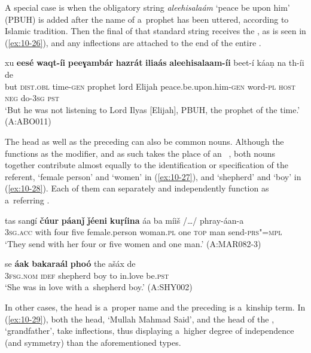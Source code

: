A special case is when the obligatory string \textit{aleehisalaám} `peace be upon him' (PBUH) is added after the name of a~prophet has been uttered, according to Islamic tradition. Then the final  of that standard string receives the , as is seen in (\ref{ex:10-26}), and any inflections are attached to the end of the entire .

\begin{exe}
\ex
\label{ex:10-26}
\gll xu \textbf{eesé} \textbf{waqt-íi} \textbf{peeɣambár} \textbf{hazrát} \textbf{iliaás} \textbf{aleehisalaam-íi} beet-í káaṇ na th-íi de \\
but \textsc{dist.obl} time-\textsc{gen} prophet lord  Elijah peace.be.upon.him-\textsc{gen} 
word-\textsc{pl} \textsc{host} \textsc{neg} do-\textsc{3sg} \textsc{pst} \\
\glt `But he was not listening to Lord Ilyas [Elijah], PBUH, the prophet of the time.' (A:ABO011)
\end{exe}

The head as well as the preceding  can also be common nouns. Although the  functions as the modifier, and as such takes the place of an~ , both nouns together contribute almost equally to the identification or specification of the referent, `female person' and `women' in (\ref{ex:10-27}), and `shepherd' and `boy' in (\ref{ex:10-28}). Each of them can separately and independently function as a~referring  . 

\ea
\label{ex:10-27}
\gll tas sanɡí \textbf{čúur} \textbf{páanǰ} \textbf{ǰéeni} \textbf{kuṛíina} áa ba míiš /{\ldots}/ phray-áan-a\\
\textsc{3sg.acc} with four five female.person woman.\textsc{pl} one \textsc{top} man {} send-\textsc{prs"=mpl}\\
\glt `They send with her four or five women and one man.' (A:MAR082-3)

\ex
\label{ex:10-28}
\gll se \textbf{áak} \textbf{bakaraál} \textbf{phoó} the ašáx de  \\
\textsc{3fsg.nom} \textsc{idef} shepherd boy to in.love be.\textsc{pst}  \\
\glt `She was in love with a~shepherd boy.' (A:SHY002)
\z

In other cases, the head is a~proper name and the preceding  is a~kinship term. In (\ref{ex:10-29}), both the  head, `Mullah Mahmad Said', and the head of the , `grandfather', take inflections, thus displaying a~higher degree of independence (and symmetry) than the aforementioned types. 

